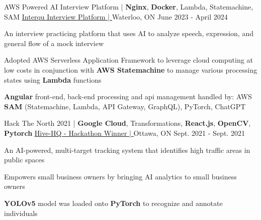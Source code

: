 \begin{cventries}
	\cventry
	{AWS Powered AI Interview Platform | \textbf{Nginx}, \textbf{Docker}, Lambda, Statemachine, SAM}
	{\underline{\href{https://github.com/Interqu}{Interqu Interview Platform | \ExternalLink}}} %
	{Waterloo, ON} %
	{June 2023 - April 2024} %
	{
		\begin{cvitems} %
			\item {An interview practicing platform that uses AI to analyze speech, expression, and general flow of a mock interview}
			\item {Adopted AWS Serverless Application Framework to leverage cloud computing at low costs in conjunction with \textbf{AWS Statemachine} to manage various processing states using \textbf{Lambda} functions}
			\item {\textbf{Angular} front-end, back-end processing and api management handled by: AWS \textbf{SAM} (Statemachine, Lambda, API Gateway, GraphQL), PyTorch, ChatGPT}
		\end{cvitems}
	}

	\cventry
	{Hack The North 2021 | \textbf{Google Cloud}, Transformations, \textbf{React.js}, \textbf{OpenCV}, \textbf{Pytorch}}
	{\underline{\href{https://devpost.com/software/hive-hq}{Hive-HQ - Hackathon Winner | \ExternalLink}}} %
	{Ottawa, ON} %
	{Sept. 2021 - Sept. 2021} %
	{
		\begin{cvitems} %
			\item {An AI-powered, multi-target tracking system that identifies high traffic areas in public spaces}
			\item {Empowers small business owners by bringing AI analytics to small business owners}
			\item {\textbf{YOLOv5} model was loaded onto \textbf{PyTorch} to recognize and annotate individuals}
		\end{cvitems}
	}






\end{cventries}
